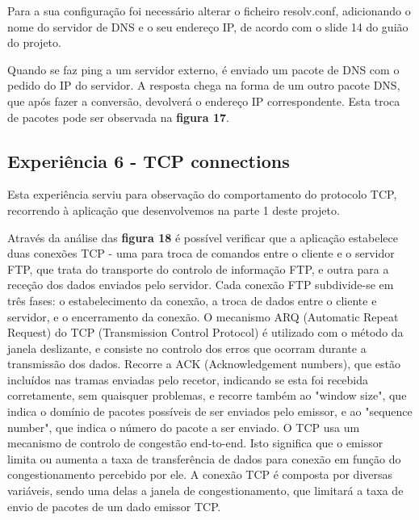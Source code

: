 \documentclass[article, a4paper, 11pt, oneside]{memoir}
\begin{document}
Para a sua configuração foi necessário alterar o ficheiro resolv.conf, 
adicionando o nome do servidor de DNS e o seu endereço IP, de acordo com o slide 14 do guião do projeto.

Quando se faz ping a um servidor externo, é enviado um pacote de DNS com o pedido do IP do servidor.
A resposta chega na forma de um outro pacote DNS, que após fazer a conversão, 
devolverá o endereço IP correspondente.
Esta troca de pacotes pode ser observada na \textbf{figura 17}.

\subsection{Experiência 6 - TCP connections}

Esta experiência serviu para observação do comportamento do protocolo TCP, 
recorrendo à aplicação que desenvolvemos na parte 1 deste projeto. 

Através da análise das \textbf{figura 18} é possível verificar que a aplicação estabelece duas conexões TCP - 
uma para troca de comandos entre o cliente e o servidor FTP, 
que trata do transporte do controlo de informação FTP, e outra para a receção dos dados enviados pelo servidor.
Cada conexão FTP subdivide-se em três fases: o estabelecimento da conexão, a troca de dados entre o cliente e servidor, e o encerramento da conexão.
O mecanismo ARQ (Automatic Repeat Request) do TCP (Transmission Control Protocol) é utilizado com o método da janela deslizante, 
e consiste no controlo dos erros que ocorram durante a transmissão dos dados.
Recorre a ACK (Acknowledgement numbers), que estão incluídos nas tramas enviadas pelo recetor, indicando se esta foi 
recebida corretamente, sem quaisquer problemas, e recorre também ao "window size", que indica o domínio de pacotes 
possíveis de ser enviados pelo emissor, e ao "sequence number", que indica o número do pacote a ser enviado.
O TCP usa um mecanismo de controlo de congestão end-to-end. Isto significa que o emissor limita ou aumenta a taxa de 
transferência de dados para conexão em função do congestionamento percebido por ele.
A conexão TCP é composta por diversas variáveis, sendo uma delas a janela de congestionamento, que limitará a taxa de envio de pacotes de um dado emissor TCP.
\end{document}
